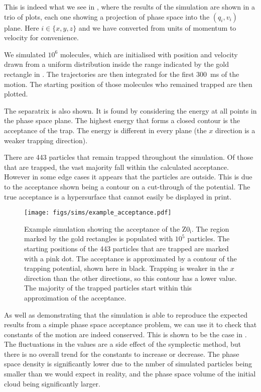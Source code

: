 This is indeed what we see in , where the
results of the simulation are shown in a trio of plots, each one showing a
projection of phase space into the $(q_i, v_i)$ plane. Here $i\in\{x, y, z\}$
and we have converted from units of momentum to velocity for convenience. 

We simulated $10^6$ \CaF{} molecules, which are initialised with position and
velocity drawn from a uniform distribution inside the range indicated by the
gold rectangle in . The trajectories are then
integrated for the first \SI{300}{\milli\second} of the motion. The starting
position of those molecules who remained trapped are then plotted.

The separatrix is also shown. It is found by considering the energy at all
points in the phase space plane. The highest energy that forms a closed contour
is the acceptance of the trap. The energy is different in every plane (the $x$
direction is a weaker trapping direction).

There are 443 particles that remain trapped throughout the simulation. Of those
that are trapped, the vast majority fall within the calculated acceptance.
However in some edge cases it appears that the particles are outside. This is
due to the acceptance shown being a contour on a cut-through of the potential.
The true acceptance is a hypersurface that cannot easily be displayed in print.

%
\begin{figure}
  \centering
  \texttt{[image: figs/sims/example\_acceptance.pdf]}
  \caption{Example simulation showing the acceptance of the $\mathrm{Z0_i}$.
  The region marked by the gold rectangles is populated with $10^5$ particles.
  The starting positions of the 443 particles that are trapped are marked with a pink dot.
  The acceptance is approximated by a contour of the trapping potential, shown
  here in black. Trapping is weaker in the $x$ direction than the other
  directions, so this contour has a lower value. The majority of the trapped
  particles start within this approximation of the acceptance.}
  \label{design:fig:acceptance}
\end{figure}

As well as demonstrating that the simulation is able to reproduce the expected
results from a simple phase space acceptance problem, we can use it to check
that constants of the motion are indeed conserved. This is shown to be the case
in .  The fluctuations in the values are a
side effect of the symplectic method, but there is no overall trend for the
constants to increase or decrease.  \cite{doi:10.1119/1.2034523} The phase
space density is significantly lower due to the nmber of simulated particles
being smaller than we would expect in reality, and the phase space volume of
the initial cloud being significantly larger.


